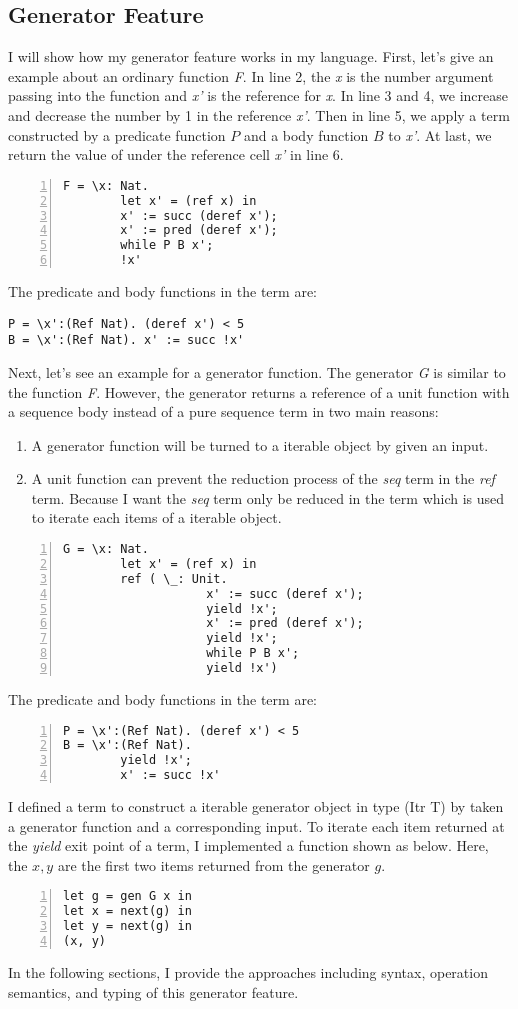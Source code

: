 \subsection{Generator Feature}
I will show how my generator feature works in my language. First, let's give an example about an ordinary function \textit{F}. In line 2, the \textit{x} is the number argument passing into the function and \textit{x'} is the reference for \textit{x}. In line 3 and 4, we increase and decrease the number by 1 in the reference \textit{x'}. Then in line 5, we apply a \while term constructed by a predicate function $P$ and a body function $B$ to \textit{x'}. At last, we return the value of under the reference cell \textit{x'} in line 6.
\begin{lstlisting}[basicstyle=\small, numbers=left]
F = \x: Nat.
		let x' = (ref x) in 
		x' := succ (deref x');
		x' := pred (deref x');
		while P B x';
		!x'
\end{lstlisting}
The predicate and body functions in the \while term are: 
\begin{lstlisting}[basicstyle=\small]
P = \x':(Ref Nat). (deref x') < 5
B = \x':(Ref Nat). x' := succ !x'
\end{lstlisting}
Next, let's see an example for a generator function. The generator \textit{G} is similar to the function \textit{F}. However, the generator returns a reference of a unit function with a sequence body instead of a pure sequence term in two main reasons:
\begin{enumerate}
	\item A generator function will be turned to a iterable object by given an input.
	\item A unit function can prevent the reduction process of the \textit{seq} term in the \textit{ref} term. Because I want the \textit{seq} term only be reduced in the \nt term which is used to iterate each items of a iterable object. 
\end{enumerate}
\begin{lstlisting}[basicstyle=\small, numbers=left]
G = \x: Nat.
		let x' = (ref x) in 
		ref ( \_: Unit.
					x' := succ (deref x');
					yield !x';
					x' := pred (deref x');
					yield !x';
					while P B x';
					yield !x')
\end{lstlisting}
The predicate and body functions in the \while term are:
\begin{lstlisting}[basicstyle=\small, numbers=left]
P = \x':(Ref Nat). (deref x') < 5
B = \x':(Ref Nat). 
		yield !x'; 
		x' := succ !x'
\end{lstlisting}
I defined a \gen term to construct a iterable generator object in type (Itr T) by taken a generator function and a corresponding input. To iterate each item returned at the \textit{yield} exit point of a \gen term, I implemented a \nt function shown as below. Here, the $x, y$ are the first two items returned from the generator $g$.
\begin{lstlisting}[basicstyle=\small, numbers=left]
let g = gen G x in 
let x = next(g) in
let y = next(g) in
(x, y)
\end{lstlisting}
In the following sections, I provide the approaches including syntax, operation semantics, and typing of this generator feature. 